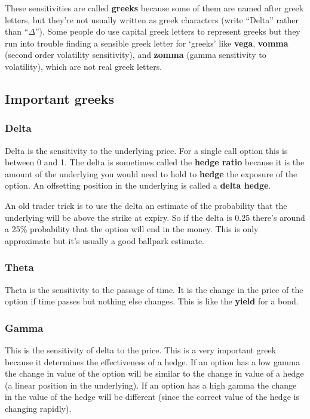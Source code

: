 These sensitivities are called \textbf{greeks} because some of them are named after greek letters, but they're not usually written as greek characters (write ``Delta'' rather than ``$\Delta$''). Some people do use capital greek letters to represent greeks but they run into trouble finding a sensible greek letter for `greeks' like \textbf{vega}, \textbf{vomma} (second order volatility sensitivity), and \textbf{zomma} (gamma sensitivity to volatility), which are not real greek letters. 
\subsection{Important greeks}

\subsubsection{Delta}

Delta is the sensitivity to the underlying price. For a single call option this is between 0 and 1. The delta is sometimes called the \textbf{hedge ratio} because it is the amount of the underlying you would need to hold to \textbf{hedge} the exposure of the option. An offsetting position in the underlying is called a \textbf{delta hedge}.
 
An old trader trick is to use the delta an estimate of the probability that the underlying will be above the strike at expiry. So if the delta is 0.25 there's around a 25\% probability that the option will end in the money.  This is only approximate but it's usually a good ballpark estimate.

\subsubsection{Theta}

Theta is the sensitivity to the passage of time. It is the change in the price of the option if time passes but nothing else changes. This is like the \textbf{yield} for a bond.

\subsubsection{Gamma}

This is the sensitivity of delta to the price. This is a very important greek because it determines the effectiveness of a hedge. If an option has a low gamma the change in value of the option will be similar to the change in value of a hedge (a linear position in the underlying). If an option has a high gamma the change in the value of the hedge will be different (since the correct value of the hedge is changing rapidly). 


